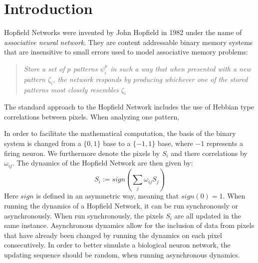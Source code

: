 \section{Introduction}

Hopfield Networks were invented by John Hopfield in 1982 under the name of \textit{associative neural network}. They are content addressable binary memory systems that are insensitive to small errors used to model associative memory problems: 
\begin{quote}
\textit{Store a set of $p$ patterns $\psi_i^\mu$ in such a way that when presented with a new pattern $\zeta_i$, the network responds by producing whichever one of the stored patterns most closely resembles $\zeta_i$} \citep{Polk:2002fk}
\end{quote}

The standard approach to the Hopfield Network includes the use of Hebbian type correlations between pixels. When analyzing one pattern, 


In order to facilitate the mathematical computation, the basis of the binary system is changed from a $\{0,1\}$ base to a $\{-1,1\}$ base, where $-1$ represents a firing neuron. We furthermore denote the pixels by $S_i$ and there correlations by $\omega_{ij}$. The dynamics of the Hopfield Network are then given by:
\begin{equation}
S_i := sign \left( \sum_j \omega_{ij} S_j \right)
\label{eq: sequential dynamics}
\end{equation}
Here $sign$ is defined in an asymmetric way, meaning that $sign(0)=1$. 
When running the dynamics of a Hopfield Network, it can be run synchronously or asynchronously. When run synchronously, the pixels $S_i$ are all updated in the same instance. Asynchronous dynamics allow for the inclusion of data from pixels that have already been changed by running the dynamics on each pixel consecutively. In order to better simulate a biological neuron network, the updating sequence should be random, when running asynchronous dynamics. 

